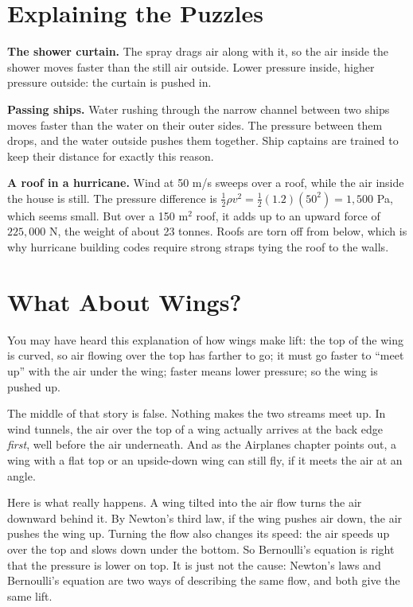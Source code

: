 \section{Explaining the Puzzles}
\textbf{The shower curtain.} The spray drags air along with it, so the air inside the shower moves faster than the still air
outside. Lower pressure inside, higher pressure outside: the curtain is pushed in.

\textbf{Passing ships.} Water rushing through the narrow channel between two ships moves faster than the water on their outer
sides. The pressure between them drops, and the water outside pushes them together. Ship captains are trained to keep their
distance for exactly this reason.

\textbf{A roof in a hurricane.} Wind at 50 m/s sweeps over a roof, while the air inside the house is still. The pressure difference
is $\frac{1}{2}\rho v^2 = \frac{1}{2}(1.2)(50^2) = 1{,}500$ Pa, which seems small. But over a 150 m$^2$ roof, it adds up to an upward force of
$225{,}000$ N, the weight of about 23 tonnes. Roofs are torn off from below, which is why hurricane building codes require
strong straps tying the roof to the walls.

\section{What About Wings?}
You may have heard this explanation of how wings make lift: the top of the wing is curved, so air flowing over the top has farther
to go; it must go faster to ``meet up'' with the air under the wing; faster means lower pressure; so the wing is pushed up.

The middle of that story is false. Nothing makes the two streams meet up. In wind tunnels, the air over the top of a wing actually
arrives at the back edge \emph{first}, well before the air underneath. And as the Airplanes chapter points out, a wing with a flat top or
an upside-down wing can still fly, if it meets the air at an angle.

Here is what really happens. A wing tilted into the air flow turns the air downward behind it. By Newton's third law, if the wing
pushes air down, the air pushes the wing up. Turning the flow also changes its speed: the air speeds up over the top and slows down
under the bottom. So Bernoulli's equation is right that the pressure is lower on top. It is just not the cause: Newton's laws and
Bernoulli's equation are two ways of describing the same flow, and both give the same lift.

